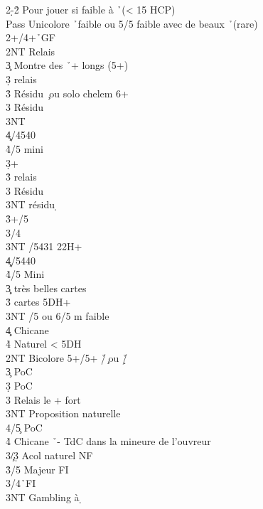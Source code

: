\documentclass[a4paper]{article}
\begin{document}
\begin{bidtable}
2\d-2\h \> Pour jouer si faible à \h\ (< 15 HCP)\\
Pass \> Unicolore \h\ faible ou 5/5 faible avec de beaux \h\ (rare)\\
2\s {}+\s /4+\h\ GF\+\\
2NT \> Relais\+\\
3\c \> Montre des \h\ + longs (5+)\+\\
3\d \> relais\+\\
3\h \> Résidu \c\ ou solo chelem 6+\\
3\s \> Résidu \d \\
3NT \\
4\c\d {}/4540\\
4\h {}/5 mini\-\-\\
3\d {}+ \s \+\\
3\h \> relais\+\\
3\s \> Résidu \c \\
3NT \> résidu \d \-\-\\
3\h {}+/5\\
3\s {}/4\\
3NT /5431 22H+\\
4\c\d {}/5440\\
4\h {}/5 Mini\-\\
3\c\d {} très belles cartes\\
3\h\s {} cartes 5DH+\\
3NT /5 ou 6/5 m faible\\
4\c\d \> Chicane\\
4\h\s \> Naturel < 5DH\-\\
2NT \> Bicolore 5+/5+ \h /\c\ ou \h /\d \+\\
3\c \> PoC\\
3\d \> PoC\\
3\s \> Relais le + fort\\
3NT \> Proposition naturelle\\
4/5\c \> PoC\\
4\h \> Chicane \h\ - TdC dans la mineure de l'ouvreur\-\\
3\c/3\d \> Acol naturel NF\\
3\h {}/5 Majeur FI\\
3\s {}\s /4\h\ FI\\
3NT \> Gambling à \d 
\end{bidtable}
\end{document}
